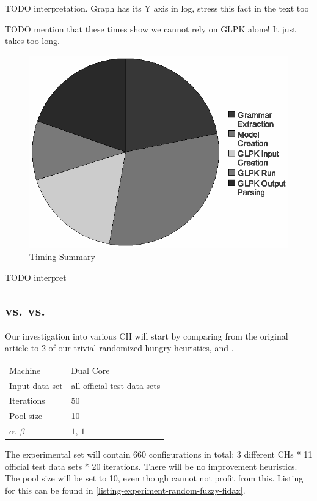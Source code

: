 TODO interpretation. Graph has its Y axis in log, stress this fact in the text too

TODO mention that these times show we cannot rely on GLPK alone! It just takes too long.

\begin{figure}
  \caption{Timing Summary}
  \label{image-experiment-timing-summary}
  \centering
    \includegraphics[width=.6\textwidth]{images/experiments/timing-pie}
\end{figure}

TODO interpret

\subsection{ vs.  vs. }


Our investigation into various CH will start by comparing  from the original article \cite{fidax} to 2 of our trivial randomized hungry heuristics,  and .

\begin{center}
\bigskip
\begin{tabular}{| l | l |}
  \hline
  \hline
  Machine           & Dual Core \\
  Input data set    & all official test data sets \\
  Iterations        & 50 \\
  Pool size         & 10 \\
  $\alpha$, $\beta$ & $1$, $1$ \\
  \hline
\end{tabular}
\bigskip
\end{center}

The experimental set will contain 660 configurations in total: 3 different CHs * 11 official test data sets * 20 iterations. There will be no improvement heuristics. The pool size will be set to 10, even though  cannot not profit from this. Listing for this can be found in \ref{listing-experiment-random-fuzzy-fidax}.

